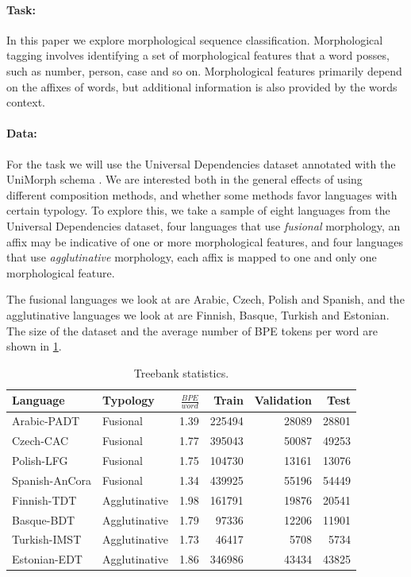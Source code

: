 \documentclass[11pt]{article}
\begin{document}
    \paragraph{Task:} In this paper we explore morphological sequence classification. Morphological tagging involves identifying a set of morphological features that a word posses, such as number, person, case and so on. 
    Morphological features primarily depend on the affixes of words, but additional information is also provided by the words context. 
    
    \paragraph{Data:} For the task we will use the Universal Dependencies dataset \citep{nivre2018} annotated with the UniMorph schema \citep{mccarthy2018marrying}. We are interested both in the general effects of using different composition methods, and whether some methods favor languages with certain typology. To explore this, we take a sample of eight languages from the Universal Dependencies dataset, four languages that use \textit{fusional} morphology, an affix may be indicative of one or more morphological features, and four languages that use \textit{agglutinative} morphology, each affix is mapped to one and only one morphological feature. 
    
   	The fusional languages we look at are Arabic, Czech, Polish and Spanish, and the agglutinative languages we look at are Finnish, Basque, Turkish and Estonian. The size of the dataset and the average number of BPE tokens per word are shown in \cref{tab:data}.
    
    	\begin{table}[h]
		\centering
		\begin{tabular}{l|lrrrr}
			Language & Typology & $\frac{BPE}{word}$ & Train & Validation & Test \\
			\hline
			Arabic-PADT  & Fusional & 1.39 & 225494 & 28089 & 28801  \\
			Czech-CAC   & Fusional & 1.77 & 395043 & 50087 & 49253 \\
			Polish-LFG & Fusional & 1.75 & 104730 & 13161 & 13076 \\
			Spanish-AnCora & Fusional & 1.34 & 439925 & 55196 & 54449 \\
			Finnish-TDT & Agglutinative & 1.98 & 161791 & 19876 & 20541 \\
			Basque-BDT  & Agglutinative & 1.79 & 97336 & 12206 & 11901 \\
			Turkish-IMST & Agglutinative & 1.73 & 46417 & 5708 & 5734 \\
			Estonian-EDT & Agglutinative & 1.86 & 346986 & 43434 & 43825 \\
		\end{tabular}
		\caption{\label{tab:data} Treebank statistics.}
	\end{table}
    
\end{document}
